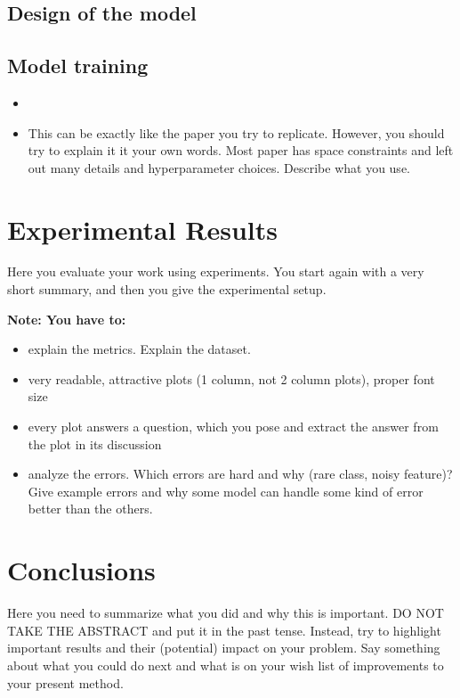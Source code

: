 \documentclass{article}
\begin{document}
\subsection{Design of the model}


\subsection{Model training}

\begin{itemize}
\item 
\item This can be exactly like the paper you try to replicate. However, you should try to explain it it your own words. Most paper has space constraints and left out many details and hyperparameter choices. Describe what you use.
\end{itemize}


\section{Experimental Results}
\label{sec:exp}

Here you evaluate your work using experiments.  You start again with a very short summary, and then you
give the experimental setup. 

{\bf Note: You have to:}
\begin{itemize}
\item explain the metrics. Explain the dataset.
\item very readable, attractive plots (1 column, not 2 column plots),
proper font size
\item every plot answers a question, which you pose and extract the
answer from the plot in its discussion
\item analyze the errors. Which errors are hard and why (rare class, noisy feature)? Give example errors and why some model can handle some kind of error better than the others.
\end{itemize}

\section{Conclusions}
\label{sec:conclusion}

Here you need to summarize what you did and why this is important.  DO
NOT TAKE THE ABSTRACT and put it in the past tense. Instead, try to
highlight important results and their (potential) impact on your
problem. Say something about what you could do next and what is on
your wish list of improvements to your present method.
\end{document}
